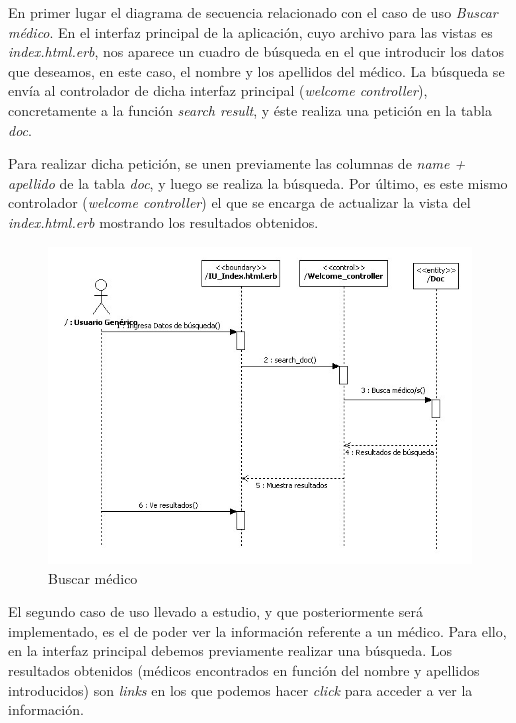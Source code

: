 \documentclass[a4paper,oneside,11pt]{book}
\begin{document}
		En primer lugar el diagrama de secuencia relacionado con el caso de uso \textit{Buscar médico}. En el interfaz principal de la aplicación, cuyo archivo para las vistas es \textit{index.html.erb}, nos aparece un cuadro de búsqueda en el que introducir los datos que deseamos, en este caso, el nombre y los apellidos del médico. La búsqueda se envía al controlador de dicha interfaz principal (\textit{welcome controller}), concretamente a la función \textit{search result}, y éste realiza una petición en la tabla \textit{doc}.
		
		Para realizar dicha petición, se unen previamente las columnas de \textit{name + apellido} de la tabla \textit{doc}, y luego se realiza la búsqueda. Por último, es este mismo controlador  (\textit{welcome controller}) el que se encarga de actualizar la vista del \textit{index.html.erb} mostrando los resultados obtenidos.
		
		\bigskip
		\bigskip
		
		\begin{figure}[H]
		  \centering
		    \includegraphics[width=16cm]{img/jpg/secuencia/01_BuscarMedico.jpg}
		  \caption{Buscar médico}
		  \label{fig:sec_general_buscarmedico}
		\end{figure}
		\newpage
		El segundo caso de uso llevado a estudio, y que posteriormente será implementado, es el de poder ver la información referente a un médico. Para ello, en la interfaz principal debemos previamente realizar una búsqueda. Los resultados obtenidos (médicos encontrados en función del nombre y apellidos introducidos) son \textit{links} en los que podemos hacer \textit{click} para acceder a ver la información.
		
\end{document}
